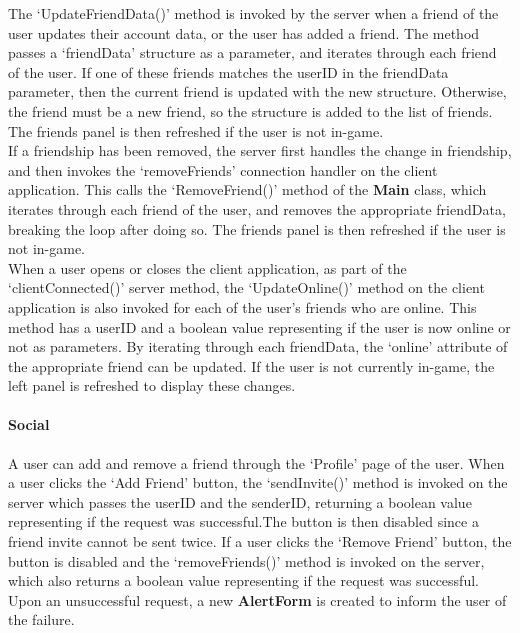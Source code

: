 \documentclass{article}
\begin{document}
The `UpdateFriendData()' method is invoked by the server when a friend of the user updates their account data, or the user has added a friend. The method passes a `friendData' structure as a parameter, and iterates through each friend of the user. If one of these friends matches the userID in the friendData parameter, then the current friend is updated with the new structure. Otherwise, the friend must be a new friend, so the structure is added to the list of friends. The friends panel is then refreshed if the user is not in-game. \\

If a friendship has been removed, the server first handles the change in friendship, and then invokes the `removeFriends' connection handler on the client application. This calls the `RemoveFriend()' method of the \textbf{Main} class, which iterates through each friend of the user, and removes the appropriate friendData, breaking the loop after doing so. The friends panel is then refreshed if the user is not in-game. \\

When a user opens or closes the client application, as part of the `clientConnected()' server method, the `UpdateOnline()' method on the client application is also invoked for each of the user's friends who are online. This method has a userID and a boolean value representing if the user is now online or not as parameters. By iterating through each friendData, the `online' attribute of the appropriate friend can be updated. If the user is not currently in-game, the left panel is refreshed to display these changes.

\paragraph{Social\\}

A user can add and remove a friend through the `Profile' page of the user. When a user clicks the `Add Friend' button, the `sendInvite()' method is invoked on the server which passes the userID and the senderID, returning a boolean value representing if the request was successful.\@ The button is then disabled since a friend invite cannot be sent twice. If a user clicks the `Remove Friend' button, the button is disabled and the `removeFriends()' method is invoked on the server, which also returns a boolean value representing if the request was successful. Upon an unsuccessful request, a new \textbf{AlertForm} is created to inform the user of the failure. \\
\end{document}
